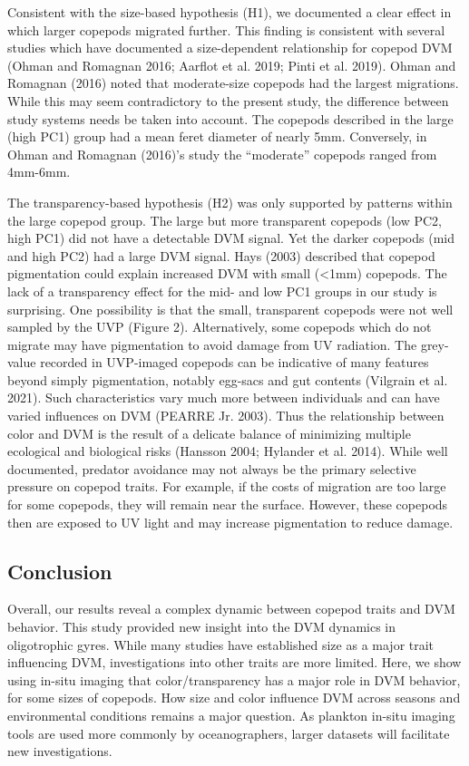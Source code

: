 \documentclass[
]{article}
\begin{document}
Consistent with the size-based hypothesis (H1), we documented a clear
effect in which larger copepods migrated further. This finding is
consistent with several studies which have documented a size-dependent
relationship for copepod DVM (Ohman and Romagnan 2016; Aarflot et al.
2019; Pinti et al. 2019). Ohman and Romagnan (2016) noted that
moderate-size copepods had the largest migrations. While this may seem
contradictory to the present study, the difference between study systems
needs be taken into account. The copepods described in the large (high
PC1) group had a mean feret diameter of nearly 5mm. Conversely, in Ohman
and Romagnan (2016)'s study the ``moderate'' copepods ranged from
4mm-6mm.

The transparency-based hypothesis (H2) was only supported by patterns
within the large copepod group. The large but more transparent copepods
(low PC2, high PC1) did not have a detectable DVM signal. Yet the darker
copepods (mid and high PC2) had a large DVM signal. Hays (2003)
described that copepod pigmentation could explain increased DVM with
small (\textless1mm) copepods. The lack of a transparency effect for the
mid- and low PC1 groups in our study is surprising. One possibility is
that the small, transparent copepods were not well sampled by the UVP
(Figure 2). Alternatively, some copepods which do not migrate may have
pigmentation to avoid damage from UV radiation. The grey-value recorded
in UVP-imaged copepods can be indicative of many features beyond simply
pigmentation, notably egg-sacs and gut contents (Vilgrain et al. 2021).
Such characteristics vary much more between individuals and can have
varied influences on DVM (PEARRE Jr. 2003). Thus the relationship
between color and DVM is the result of a delicate balance of minimizing
multiple ecological and biological risks (Hansson 2004; Hylander et al.
2014). While well documented, predator avoidance may not always be the
primary selective pressure on copepod traits. For example, if the costs
of migration are too large for some copepods, they will remain near the
surface. However, these copepods then are exposed to UV light and may
increase pigmentation to reduce damage.

\hypertarget{conclusion}{%
\subsection{Conclusion}\label{conclusion}}

Overall, our results reveal a complex dynamic between copepod traits and
DVM behavior. This study provided new insight into the DVM dynamics in
oligotrophic gyres. While many studies have established size as a major
trait influencing DVM, investigations into other traits are more
limited. Here, we show using in-situ imaging that color/transparency has
a major role in DVM behavior, for some sizes of copepods. How size and
color influence DVM across seasons and environmental conditions remains
a major question. As plankton in-situ imaging tools are used more
commonly by oceanographers, larger datasets will facilitate new
investigations.
\end{document}
